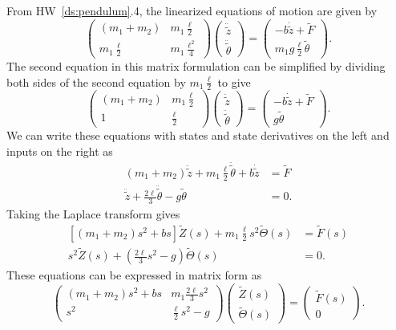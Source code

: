 
From HW~\ref{ds:pendulum}.4, the linearized equations of motion are given by
\[
\begin{pmatrix} (m_1+m_2) & m_1 \frac{\ell}{2} \\
m_1 \frac{\ell}{2} & m_1 \frac{\ell^2}{4} \end{pmatrix}\begin{pmatrix}
\ddot{\tilde{z}} \\ \ddot{\tilde{\theta}} \end{pmatrix}  =
\begin{pmatrix} -b\dot{\tilde{z}} + \tilde{F} 
	  \\
	m_1 g \frac{\ell}{2} \tilde{\theta} \end{pmatrix}.
\]
%
The second equation in this matrix formulation can be simplified by dividing both sides of the second equation by $m_1 \frac{\ell}{2}$ to give
\[
\begin{pmatrix} (m_1+m_2) & m_1 \frac{\ell}{2} \\
1 &  \frac{\ell}{2} \end{pmatrix}\begin{pmatrix}
\ddot{\tilde{z}} \\ \ddot{\tilde{\theta}} \end{pmatrix}  =
\begin{pmatrix} -b\dot{\tilde{z}} + \tilde{F} 
	  \\
	g \tilde{\theta} \end{pmatrix}.
\]
%
We can write these equations with states and state derivatives on the left and inputs on the right as
\begin{align*}
(m_1+ m_2) \ddot{\tilde{z}} + m_1\frac{\ell}{2} \ddot{\tilde{\theta}} + b\dot{\tilde{z}} &= \tilde{F} \\
\ddot{\tilde{z}} + \frac{2\ell}{3} \ddot{\tilde{\theta}} - g{\tilde{\theta}} &= 0 .
\end{align*}
%
Taking the Laplace transform gives
\begin{align*}
\left[ (m_1+m_2) s^2 + b s \right] \tilde{Z}(s) + m_1\frac{\ell}{2} s^2 \tilde{\Theta}(s) &= \tilde{F}(s) \\
s^2 \tilde{Z}(s) + \left(\frac{2 \ell}{3} s^2 - g \right)\tilde{\Theta}(s) &= 0 .
\end{align*}
%
These equations can be expressed in matrix form as
\[
\begin{pmatrix} (m_1+m_2)s^2 + bs & m_1 \frac{2 \ell}{3}s^2 \\
s^2 & \frac{\ell}{2}s^2-g \end{pmatrix}\begin{pmatrix}
\tilde{Z}(s) \\ \tilde{\Theta}(s) \end{pmatrix}  =
\begin{pmatrix} \tilde{F}(s) \\
	0 \end{pmatrix}.
\]
